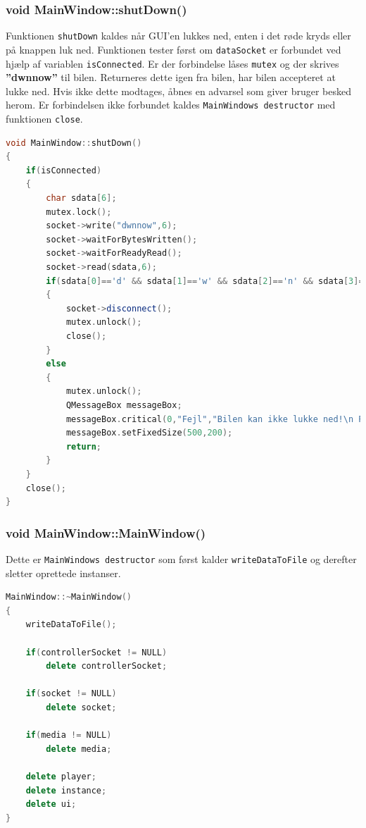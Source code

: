 \subsubsection{void MainWindow::shutDown()}
Funktionen \texttt{shutDown} kaldes når GUI'en lukkes ned, enten i det røde kryds eller på knappen luk ned. Funktionen tester først om \texttt{dataSocket} er forbundet ved hjælp af variablen \texttt{isConnected}. Er der forbindelse låses \texttt{mutex} og der skrives \textbf{''dwnnow''} til bilen. Returneres dette igen fra bilen, har bilen accepteret at lukke ned. Hvis ikke dette modtages, åbnes en advarsel som giver bruger besked herom. Er forbindelsen ikke forbundet kaldes \texttt{MainWindows destructor} med funktionen \texttt{close}. 
\begin{lstlisting}[caption={shutDown},label=lst:shutDown, language=c++]
void MainWindow::shutDown()
{
    if(isConnected)
    {
        char sdata[6];
        mutex.lock();
        socket->write("dwnnow",6);
        socket->waitForBytesWritten();
        socket->waitForReadyRead();
        socket->read(sdata,6);
        if(sdata[0]=='d' && sdata[1]=='w' && sdata[2]=='n' && sdata[3]=='n' && sdata[4]=='o' && sdata[5]=='w')
        {
            socket->disconnect();
            mutex.unlock();
            close();
        }
        else
        {
            mutex.unlock();
            QMessageBox messageBox;
            messageBox.critical(0,"Fejl","Bilen kan ikke lukke ned!\n Prøv igen");
            messageBox.setFixedSize(500,200);
            return;
        }
    }
    close();
}
\end{lstlisting}

\subsubsection{void MainWindow::MainWindow()}
Dette er \texttt{MainWindows destructor} som først kalder \texttt{writeDataToFile} og derefter sletter oprettede instanser.
\begin{lstlisting}[caption={MainWindow},label=lst:MainWindow, language=c++]
MainWindow::~MainWindow()
{
    writeDataToFile();

    if(controllerSocket != NULL)
        delete controllerSocket;

    if(socket != NULL)
        delete socket;

    if(media != NULL)
        delete media;

    delete player;
    delete instance;
    delete ui;
}
\end{lstlisting}


